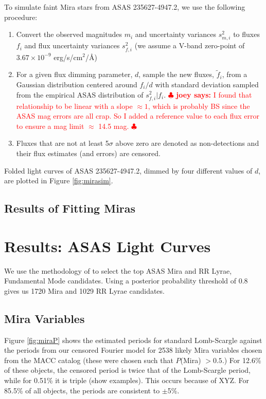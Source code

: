 \documentclass[12pt,preprint]{aastex}
\newcommand{\joey}[1] { \textcolor{red} {
\ensuremath{\clubsuit} {\bf joey says:}  {#1}
\ensuremath{\clubsuit} } }%
\begin{document}
To simulate faint Mira stars from ASAS 235627-4947.2, we use the following procedure:
\begin{enumerate}
\item Convert the observed magnitudes $m_i$ and uncertainty variances $s^2_{m,i}$ to fluxes $f_i$ and flux uncertainty variances $s^2_{f,i}$ (we assume a V-band zero-point of $3.67\times10^{-9}$ erg/s/cm$^2$/\AA)
\item For a given flux dimming parameter, $d$, sample the new fluxes, $\tilde{f}_i$, from a Gaussian distribution centered around $f_i / d$ with standard deviation sampled from the empirical ASAS distribution of $s^2_{f,i} | f_i$. \joey{I found that relationship to be linear with a slope $\approx 1$, which is probably BS since the ASAS mag errors are all crap.  So I added a reference value to each flux error to ensure a mag limit $\approx$ 14.5 mag.}
\item Fluxes that are not at least 5$\sigma$ above zero are denoted as non-detections and their flux estimates (and errors) are censored.
\end{enumerate}
Folded light curves of ASAS 235627-4947.2, dimmed by four different values of $d$, are plotted in Figure \ref{fig:mirasim}.



\subsection{Results of Fitting Miras}


\section{Results: ASAS Light Curves}
\label{sec:results}

We use the methodology of \cite{2011arXiv1106.2832R} to select the top ASAS Mira  and RR Lyrae, Fundamental Mode candidates.  Using a posterior probability threshold of 0.8 gives us 1720 Mira  and 1029 RR Lyrae candidates.

 \subsection{Mira Variables}

Figure \ref{fig:miraP} shows the estimated periods for standard Lomb-Scargle against the periods from our censored Fourier model for 2538 likely Mira variables chosen from the MACC catalog (these were chosen such that $P$(Mira) $>0.5$.)  For 12.6\% of these objects, the censored period is twice that of the Lomb-Scargle period, while for 0.51\% it is triple (show examples).  This occurs because of XYZ.  For 85.5\% of all objects, the periods are consistent to $\pm$5\%.
\end{document}
